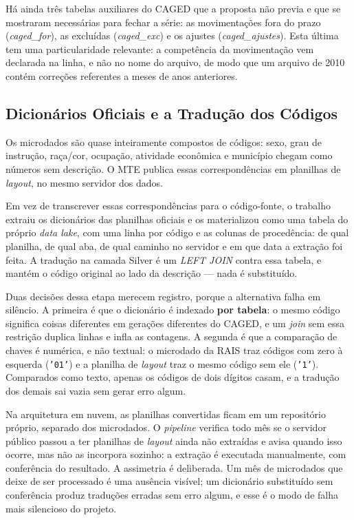 Há ainda três tabelas auxiliares do CAGED que a proposta não previa e que se mostraram necessárias para fechar a série: as movimentações fora do prazo (\textit{caged\_for}), as excluídas (\textit{caged\_exc}) e os ajustes (\textit{caged\_ajustes}). Esta última tem uma particularidade relevante: a competência da movimentação vem declarada na linha, e não no nome do arquivo, de modo que um arquivo de 2010 contém correções referentes a meses de anos anteriores.

\subsection{Dicionários Oficiais e a Tradução dos Códigos}
\label{subsec:dicionarios}

Os microdados são quase inteiramente compostos de códigos: sexo, grau de instrução, raça/cor, ocupação, atividade econômica e município chegam como números sem descrição. O MTE publica essas correspondências em planilhas de \textit{layout}, no mesmo servidor dos dados.

Em vez de transcrever essas correspondências para o código-fonte, o trabalho extraiu os dicionários das planilhas oficiais e os materializou como uma tabela do próprio \textit{data lake}, com uma linha por código e as colunas de procedência: de qual planilha, de qual aba, de qual caminho no servidor e em que data a extração foi feita. A tradução na camada Silver é um \textit{LEFT JOIN} contra essa tabela, e mantém o código original ao lado da descrição --- nada é substituído.

Duas decisões dessa etapa merecem registro, porque a alternativa falha em silêncio. A primeira é que o dicionário é indexado \textbf{por tabela}: o mesmo código significa coisas diferentes em gerações diferentes do CAGED, e um \textit{join} sem essa restrição duplica linhas e infla as contagens. A segunda é que a comparação de chaves é numérica, e não textual: o microdado da RAIS traz códigos com zero à esquerda (\texttt{'01'}) e a planilha de \textit{layout} traz o mesmo código sem ele (\texttt{'1'}). Comparados como texto, apenas os códigos de dois dígitos casam, e a tradução dos demais sai vazia sem gerar erro algum.

Na arquitetura em nuvem, as planilhas convertidas ficam em um repositório próprio, separado dos microdados. O \textit{pipeline} verifica todo mês se o servidor público passou a ter planilhas de \textit{layout} ainda não extraídas e avisa quando isso ocorre, mas não as incorpora sozinho: a extração é executada manualmente, com conferência do resultado. A assimetria é deliberada. Um mês de microdados que deixe de ser processado é uma ausência visível; um dicionário substituído sem conferência produz traduções erradas sem erro algum, e esse é o modo de falha mais silencioso do projeto.

